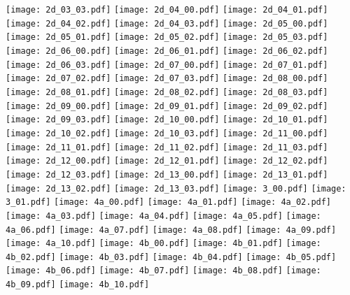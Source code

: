 \texttt{[image: 2d\_03\_03.pdf]}
\texttt{[image: 2d\_04\_00.pdf]}
\texttt{[image: 2d\_04\_01.pdf]}
\texttt{[image: 2d\_04\_02.pdf]}
\texttt{[image: 2d\_04\_03.pdf]}
\texttt{[image: 2d\_05\_00.pdf]}
\texttt{[image: 2d\_05\_01.pdf]}
\texttt{[image: 2d\_05\_02.pdf]}
\texttt{[image: 2d\_05\_03.pdf]}
\texttt{[image: 2d\_06\_00.pdf]}
\texttt{[image: 2d\_06\_01.pdf]}
\texttt{[image: 2d\_06\_02.pdf]}
\texttt{[image: 2d\_06\_03.pdf]}
\texttt{[image: 2d\_07\_00.pdf]}
\texttt{[image: 2d\_07\_01.pdf]}
\texttt{[image: 2d\_07\_02.pdf]}
\texttt{[image: 2d\_07\_03.pdf]}
\texttt{[image: 2d\_08\_00.pdf]}
\texttt{[image: 2d\_08\_01.pdf]}
\texttt{[image: 2d\_08\_02.pdf]}
\texttt{[image: 2d\_08\_03.pdf]}
\texttt{[image: 2d\_09\_00.pdf]}
\texttt{[image: 2d\_09\_01.pdf]}
\texttt{[image: 2d\_09\_02.pdf]}
\texttt{[image: 2d\_09\_03.pdf]}
\texttt{[image: 2d\_10\_00.pdf]}
\texttt{[image: 2d\_10\_01.pdf]}
\texttt{[image: 2d\_10\_02.pdf]}
\texttt{[image: 2d\_10\_03.pdf]}
\texttt{[image: 2d\_11\_00.pdf]}
\texttt{[image: 2d\_11\_01.pdf]}
\texttt{[image: 2d\_11\_02.pdf]}
\texttt{[image: 2d\_11\_03.pdf]}
\texttt{[image: 2d\_12\_00.pdf]}
\texttt{[image: 2d\_12\_01.pdf]}
\texttt{[image: 2d\_12\_02.pdf]}
\texttt{[image: 2d\_12\_03.pdf]}
\texttt{[image: 2d\_13\_00.pdf]}
\texttt{[image: 2d\_13\_01.pdf]}
\texttt{[image: 2d\_13\_02.pdf]}
\texttt{[image: 2d\_13\_03.pdf]}
\texttt{[image: 3\_00.pdf]}
\texttt{[image: 3\_01.pdf]}
\texttt{[image: 4a\_00.pdf]}
\texttt{[image: 4a\_01.pdf]}
\texttt{[image: 4a\_02.pdf]}
\texttt{[image: 4a\_03.pdf]}
\texttt{[image: 4a\_04.pdf]}
\texttt{[image: 4a\_05.pdf]}
\texttt{[image: 4a\_06.pdf]}
\texttt{[image: 4a\_07.pdf]}
\texttt{[image: 4a\_08.pdf]}
\texttt{[image: 4a\_09.pdf]}
\texttt{[image: 4a\_10.pdf]}
\texttt{[image: 4b\_00.pdf]}
\texttt{[image: 4b\_01.pdf]}
\texttt{[image: 4b\_02.pdf]}
\texttt{[image: 4b\_03.pdf]}
\texttt{[image: 4b\_04.pdf]}
\texttt{[image: 4b\_05.pdf]}
\texttt{[image: 4b\_06.pdf]}
\texttt{[image: 4b\_07.pdf]}
\texttt{[image: 4b\_08.pdf]}
\texttt{[image: 4b\_09.pdf]}
\texttt{[image: 4b\_10.pdf]}
